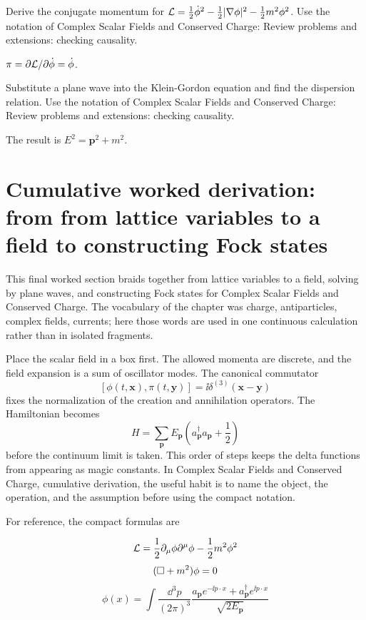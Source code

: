 \begin{exercise}
Derive the conjugate momentum for \(\mathcal L=\frac12\dot\phi^2-\frac12|\nabla\phi|^2-\frac12m^2\phi^2\).  Use the notation of Complex Scalar Fields and Conserved Charge: Review problems and extensions: checking causality.
\begin{answer}
\(\pi=\partial\mathcal L/\partial\dot\phi=\dot\phi\).
\end{answer}
\end{exercise}

\begin{exercise}
Substitute a plane wave into the Klein-Gordon equation and find the dispersion relation.  Use the notation of Complex Scalar Fields and Conserved Charge: Review problems and extensions: checking causality.
\begin{answer}
The result is \(E^2=\bm p^2+m^2\).
\end{answer}
\end{exercise}



\section{Cumulative worked derivation: from from lattice variables to a field to constructing Fock states}

This final worked section braids together from lattice variables to a field, solving by plane waves, and constructing Fock states for Complex Scalar Fields and Conserved Charge.  The vocabulary of the chapter was charge, antiparticles, complex fields, currents; here those words are used in one continuous calculation rather than in isolated fragments.

Place the scalar field in a box first.  The allowed momenta are discrete, and the field expansion is a sum of oscillator modes.  The canonical commutator
\[
  [\phi(t,\bm x),\pi(t,\bm y)]=\ii\delta^{(3)}(\bm x-\bm y)
\]
fixes the normalization of the creation and annihilation operators.  The Hamiltonian becomes
\[
  H=\sum_{\bm p}E_{\bm p}\left(a_{\bm p}^\dagger a_{\bm p}+\frac12\right)
\]
before the continuum limit is taken.  This order of steps keeps the delta functions from appearing as magic constants.  In Complex Scalar Fields and Conserved Charge, cumulative derivation, the useful habit is to name the object, the operation, and the assumption before using the compact notation.

For reference, the compact formulas are

\[
  \mathcal L=\frac12\partial_\mu\phi\partial^\mu\phi-\frac12m^2\phi^2
\]
\[
  (\Box+m^2)\phi=0
\]
\[
  \phi(x)=\int\frac{\dd^3p}{(2\pi)^3}\frac{a_{\bm p}e^{-\ii p\cdot x}+a_{\bm p}^\dagger e^{\ii p\cdot x}}{\sqrt{2E_{\bm p}}}
\]

